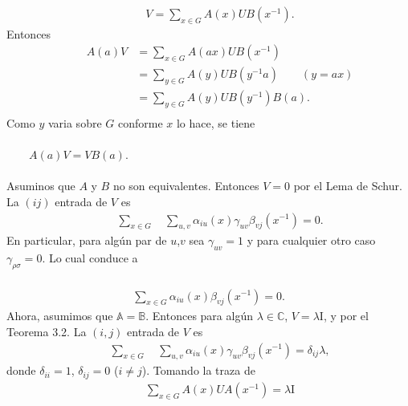 \documentclass[12pt]{book}
\theoremstyle{definition}
\newcounter{in}
\begin{document}
\begin{equation*}
\begin{aligned}
\qquad V=\sum_{x \in G} A(x)UB(x^{-1}).
\end{aligned}
\end{equation*}
Entonces
\begin{equation*}
\begin{aligned}
\qquad A(a)V &=\sum_{x \in G} A(ax)UB(x^{-1})\\
&=\sum_{y \in G} A(y)UB(y^{-1}a) \qquad (y=ax)\\
&=\sum_{y \in G} A(y)UB(y^{-1})B(a).\\
\end{aligned}
\end{equation*}
Como $y$ varia sobre $G$ conforme $x$ lo hace, 	se tiene\\~\\
$\qquad A(a)V=VB(a).$\\~\\
Asuminos que $A$ y $B$ no son equivalentes. Entonces $V=0$ por el Lema de Schur. La $(ij)$ entrada de $V$ es
\begin{equation*}
\begin{aligned}
\qquad \sum_{x \in G} \quad \sum_{u,v} \alpha_{iu}(x) \gamma_{uv} \beta_{vj}(x^{-1}) = 0.
\end{aligned}
\end{equation*}
En particular, para algún par de $u$,$v$ sea $\gamma_{uv}=1$ y para cualquier otro caso $\gamma_{\rho \sigma}=0$. Lo cual conduce a\\~\\
\begin{equation*}
\begin{aligned}
\sum_{x \in G} \alpha_{iu}(x) \beta_{vj}(x^{-1}) = 0.
\end{aligned}
\end{equation*}
Ahora, asumimos que $\mathbb{A}=\mathbb{B}$. Entonces para algún $\lambda \in \mathbb{C}$, $V=\lambda\mathrm{I}$, y por el Teorema 3.2. La $(i,j)$ entrada de $V$ es
\begin{equation*}
\begin{aligned}
\qquad \sum_{x \in G} \quad \sum_{u,v} \alpha_{iu}(x) \gamma_{uv} \beta_{vj}(x^{-1}) = \delta_{ij}\lambda,
\end{aligned}
\end{equation*}
donde $\delta_{ii}=1$, $\delta_{ij}=0$ ($i \neq j$). Tomando la traza de
\begin{equation*}
\begin{aligned}
\qquad \sum_{x \in G} A(x)UA(x^{-1}) = \lambda \mathrm{I}
\end{aligned}
\end{equation*}
\end{document}

